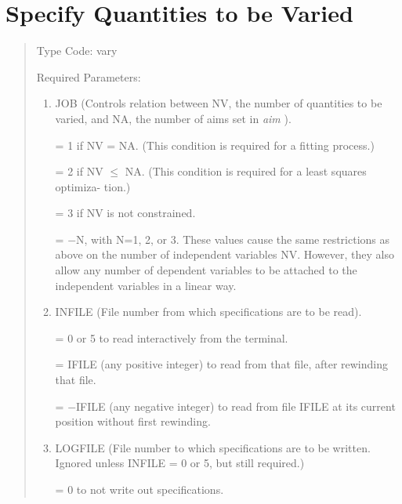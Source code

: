 \section{Specify Quantities to be Varied}    
\begin{quotation}
\noindent     Type Code:  vary
\vspace{5mm}

\noindent     Required Parameters:
\begin{enumerate}
       \item  JOB (Controls relation between NV, the number of quantities to be varied, and NA, the number of aims set in {\em aim }).

              = 1 if NV = NA.  (This condition is required for a fitting process.)

              = 2 if NV $\leq$ NA.  (This condition is required for a least squares optimiza-
 \hspace*{1em}tion.)

              = 3 if NV is not constrained.

              = $-$N, with N=1, 2, or 3.  These values cause the same restrictions as above
              \hspace*{1em}on the number of independent variables NV.  However, they also allow
              \hspace*{1em}any number of dependent variables to be attached to the independent
              \hspace*{1em}variables in a linear way.


       \item  INFILE (File number from which specifications are to be read).

              = 0 or 5 to read interactively from the terminal.

              = IFILE (any positive integer) to read from that file, after rewinding that
              \hspace*{1em}file.

              = $-$IFILE (any negative integer) to read from file IFILE at its current
              \hspace*{1em}position without first rewinding.

       \item  LOGFILE (File number to which specifications are to be
written.  Ignored unless INFILE = 0 or 5, but still required.)

              = 0 to not write out specifications.


\end{enumerate}
\end{quotation}
